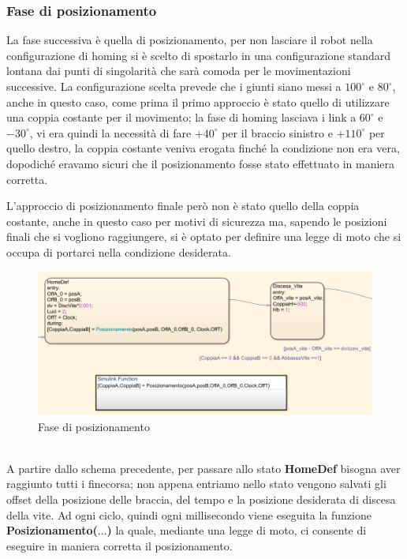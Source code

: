 \subsubsection{Fase di posizionamento}
La fase successiva è quella di posizionamento, per non lasciare il robot nella configurazione di homing si è scelto di spostarlo in una configurazione standard lontana dai punti di singolarità che sarà comoda per le movimentazioni successive. La configurazione scelta prevede che i giunti siano messi a $100^\circ$ e $80^\circ$, anche in questo caso, come prima il primo approccio è stato quello di utilizzare una coppia costante per il movimento; la fase di homing lasciava i link a $60^\circ$ e $-30^\circ$, vi era quindi la necessità di fare $+40^\circ$ per il braccio sinistro e $+110^\circ$ per quello destro, la coppia costante veniva erogata finché la condizione non era vera, dopodiché eravamo sicuri che il posizionamento fosse stato effettuato in maniera corretta. 
\par L'approccio di posizionamento finale però non è stato quello della coppia costante, anche in questo caso per motivi di sicurezza ma, sapendo le posizioni finali che si vogliono raggiungere, si è optato per definire una legge di moto che si occupa di portarci nella condizione desiderata.
\begin{figure}[ht]
\begin{center}
    \includegraphics[scale=0.65]{Immagini/Sperimentale/state2New.png}
    \caption{Fase di posizionamento}
    \label{fig:Pos}
\end{center}
\end{figure}
\\A partire dallo schema precedente, per passare allo stato \textbf{HomeDef} bisogna aver raggiunto tutti i finecorsa; non appena entriamo nello stato vengono salvati gli offset della posizione delle braccia, del tempo e la posizione desiderata di discesa della vite. Ad ogni ciclo, quindi ogni millisecondo viene eseguita la funzione \textbf{Posizionamento($\dots$)} la quale, mediante una legge di moto, ci consente di eseguire in maniera corretta il posizionamento.
